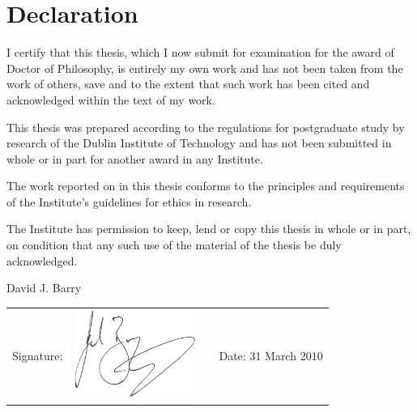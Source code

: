 {}
\section*{Declaration}\thispagestyle{plain}

I certify that this thesis, which I now submit for examination for the award of Doctor of Philosophy, is entirely my own work and has not been taken from the work of others, save and to the extent that such work has been cited and acknowledged within the text of my work.

\vspace{12pt}

\noindent This thesis was prepared according to the regulations for postgraduate study by research of the Dublin Institute of Technology and has not been submitted in whole or in part for another award in any Institute.

\vspace{12pt}

\noindent The work reported on in this thesis conforms to the principles and requirements of the Institute's guidelines for ethics in research.

\vspace{12pt}

\noindent The Institute has permission to keep, lend or copy this thesis in whole or in part, on condition that any such use of the material of the thesis be duly acknowledged.

\vspace{12pt}

\noindent David J. Barry

\vspace{2cm}

\begin{center}
\begin{tabular}{m{2cm} m{4.1cm} m{2cm} m{5cm}}
	Signature: & \includegraphics[width=4cm]{Sig} & & Date: 31\sp{st} March 2010
\end{tabular}
\end{center}